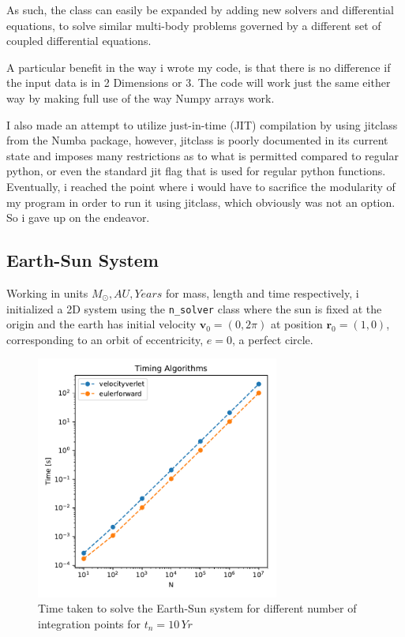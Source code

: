 \documentclass[10pt,showpacs,preprintnumbers,footinbib,amsmath,amssymb,aps,prl,twocolumn,groupedaddress,superscriptaddress,showkeys]{revtex4-1}
\begin{document}
    As such, the class can easily be expanded by adding new solvers and differential equations, to solve similar multi-body problems governed by a different set of coupled differential equations.

    A particular benefit in the way i wrote my code, is that there is no difference if the input data is in 2 Dimensions or 3. The code will work just the same either way by making full use of the way Numpy arrays work.

    I also made an attempt to utilize just-in-time (JIT) compilation by using jitclass from the Numba package, however, jitclass is poorly documented in its current state and imposes many restrictions as to what is permitted compared to regular python, or even the standard jit flag that is used for regular python functions. Eventually, i reached the point where i would have to sacrifice the modularity of my program in order to run it using jitclass, which obviously was not an option. So i gave up on the endeavor.

  \subsection{Earth-Sun System}

    Working in units $M_\odot, AU, Years$ for mass, length and time respectively, i initialized a 2D system using the \lstinline{n_solver} class where the sun is fixed at the origin and the earth has initial velocity $\mathbf v_0 = (0, 2\pi)$ at position $\mathbf r_0 = (1, 0)$, corresponding to an orbit of eccentricity, $e=0$, a perfect circle.
    
    \begin{figure}
      \center
      \includegraphics[width=8cm]{figs/timing_earthsun.pdf}
      \caption{Time taken to solve the Earth-Sun system for different number of integration points for $t_n=10\, Yr$}
      \label{fig:timing}
    \end{figure}
\end{document}
